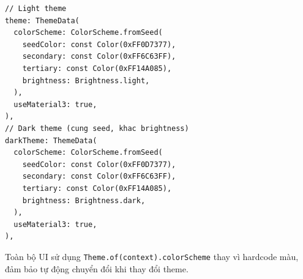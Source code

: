 \begin{lstlisting}[caption={Theme configuration trong app.dart}]
// Light theme
theme: ThemeData(
  colorScheme: ColorScheme.fromSeed(
    seedColor: const Color(0xFF0D7377),
    secondary: const Color(0xFF6C63FF),
    tertiary: const Color(0xFF14A085),
    brightness: Brightness.light,
  ),
  useMaterial3: true,
),
// Dark theme (cung seed, khac brightness)
darkTheme: ThemeData(
  colorScheme: ColorScheme.fromSeed(
    seedColor: const Color(0xFF0D7377),
    secondary: const Color(0xFF6C63FF),
    tertiary: const Color(0xFF14A085),
    brightness: Brightness.dark,
  ),
  useMaterial3: true,
),
\end{lstlisting}

Toàn bộ UI sử dụng \texttt{Theme.of(context).colorScheme} thay vì hardcode màu, đảm bảo tự động chuyển đổi khi thay đổi theme.
